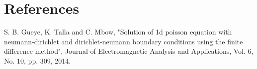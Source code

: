 \documentclass[american,a4paper,12pt]{article}
\begin{document}

\section{References} %

\begin{thebibliography}{9}
 S. B. Gueye, K. Talla and C. Mbow, "Solution of 1d poisson equation with neumann-dirichlet and dirichlet-neumann boundary conditions using the finite difference method", Journal of Electromagnetic Analysis and Applications, Vol. 6, No. 10, pp. 309, 2014.





\end{thebibliography}
\end{document}
